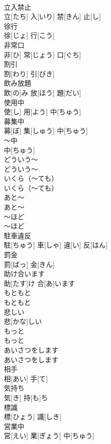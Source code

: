 \documentclass[8pt]{extreport}
\begin{document}
\begin{CJK}{UTF8}{min}
\\	立入禁止	
\\	立[たち] 入[いり] 禁[きん] 止[し]		
\\	徐行	
\\	徐[じょ] 行[こう]		
\\	非常口	
\\	非[ひ] 常[じょう] 口[ぐち]		
\\	割引	
\\	割[わり] 引[びき]		
\\	飲み放題	
\\	飲[の]み 放[ほう] 題[だい]		
\\	使用中	
\\	使[し] 用[よう] 中[ちゅう]		
\\	募集中	
\\	募[ぼ] 集[しゅう] 中[ちゅう]		
\\	～中	
\\	中[ちゅう]		
\\	どういう～	
\\	どういう～		
\\	いくら（～ても）	
\\	いくら（～ても）		
\\	あと～	
\\	あと～		
\\	～ほど	
\\	～ほど		
\\	駐車違反	
\\	駐[ちゅう] 車[しゃ] 違[い] 反[はん]		
\\	罰金	
\\	罰[ばっ] 金[きん]		
\\	助け合います	
\\	助[たす]け 合[あ]います		
\\	もともと	
\\	もともと		
\\	悲しい	
\\	悲[かな]しい		
\\	もっと	
\\	もっと		
\\	あいさつをします	
\\	あいさつをします		
\\	相手	
\\	相[あい] 手[て]		
\\	気持ち	
\\	気[き] 持[も]ち		
\\	標識	
\\	標[ひょう] 識[しき]		
\\	営業中	
\\	営[えい] 業[ぎょう] 中[ちゅう]		

\end{CJK}
\end{document}
